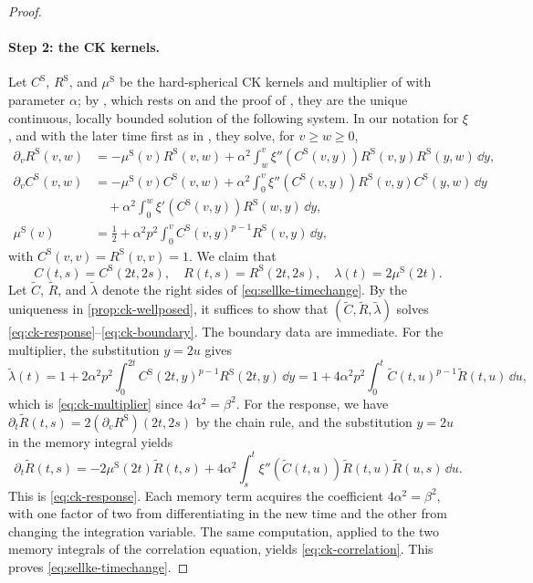 \begin{proof}
\paragraph{Step 2: the CK kernels.}
Let $C^{\mathrm S}$, $R^{\mathrm S}$, and $\mu^{\mathrm S}$ be the hard-spherical CK kernels and multiplier of \cite[arXiv version~5, Definition~4, pp.~22--23]{sellke2024} with parameter $\alpha$; by \cite[arXiv version~5, Proposition~4.2, p.~23]{sellke2024}, which rests on \cite[arXiv version~1, Theorem~1.2, p.~5]{bag2006} and the proof of \cite[Proposition~1.1]{dgm2007}, they are the unique continuous, locally bounded solution of the following system. In our notation for $\xi$, and with the later time first as in \cite{sellke2024}, they solve, for $v\ge w\ge0$,
\begin{align*}
 \partial_vR^{\mathrm S}(v,w)&=-\mu^{\mathrm S}(v)R^{\mathrm S}(v,w)
 +\alpha^2\int_w^v\xi''(C^{\mathrm S}(v,y))R^{\mathrm S}(v,y)R^{\mathrm S}(y,w)\,\dd y,\\
 \partial_vC^{\mathrm S}(v,w)&=-\mu^{\mathrm S}(v)C^{\mathrm S}(v,w)
 +\alpha^2\int_0^v\xi''(C^{\mathrm S}(v,y))R^{\mathrm S}(v,y)C^{\mathrm S}(y,w)\,\dd y\\
 &\hspace{1em}+\alpha^2\int_0^w\xi'(C^{\mathrm S}(v,y))R^{\mathrm S}(w,y)\,\dd y,\\
 \mu^{\mathrm S}(v)&=\frac12+\alpha^2p^2\int_0^vC^{\mathrm S}(v,y)^{p-1}R^{\mathrm S}(v,y)\,\dd y,
\end{align*}
with $C^{\mathrm S}(v,v)=R^{\mathrm S}(v,v)=1$. We claim that
\begin{equation}
 C(t,s)=C^{\mathrm S}(2t,2s),\quad
 R(t,s)=R^{\mathrm S}(2t,2s),\quad
 \lambda(t)=2\mu^{\mathrm S}(2t).
\label{eq:sellke-timechange}
\end{equation}
Let $\tilde C$, $\tilde R$, and $\tilde\lambda$ denote the right sides of \eqref{eq:sellke-timechange}. By the uniqueness in \cref{prop:ck-wellposed}, it suffices to show that $(\tilde C,\tilde R,\tilde\lambda)$ solves \eqref{eq:ck-response}--\eqref{eq:ck-boundary}. The boundary data are immediate. For the multiplier, the substitution $y=2u$ gives
\[
 \tilde\lambda(t)=1+2\alpha^2p^2\int_0^{2t}C^{\mathrm S}(2t,y)^{p-1}R^{\mathrm S}(2t,y)\,\dd y
 =1+4\alpha^2p^2\int_0^t\tilde C(t,u)^{p-1}\tilde R(t,u)\,\dd u,
\]
which is \eqref{eq:ck-multiplier} since $4\alpha^2=\beta^2$. For the response, we have $\partial_t\tilde R(t,s)=2(\partial_vR^{\mathrm S})(2t,2s)$ by the chain rule, and the substitution $y=2u$ in the memory integral yields
\[
 \partial_t\tilde R(t,s)=-2\mu^{\mathrm S}(2t)\tilde R(t,s)
 +4\alpha^2\int_s^t\xi''(\tilde C(t,u))\tilde R(t,u)\tilde R(u,s)\,\dd u.
\]
This is \eqref{eq:ck-response}. Each memory term acquires the coefficient $4\alpha^2=\beta^2$, with one factor of two from differentiating in the new time and the other from changing the integration variable. The same computation, applied to the two memory integrals of the correlation equation, yields \eqref{eq:ck-correlation}. This proves \eqref{eq:sellke-timechange}.


\end{proof}
